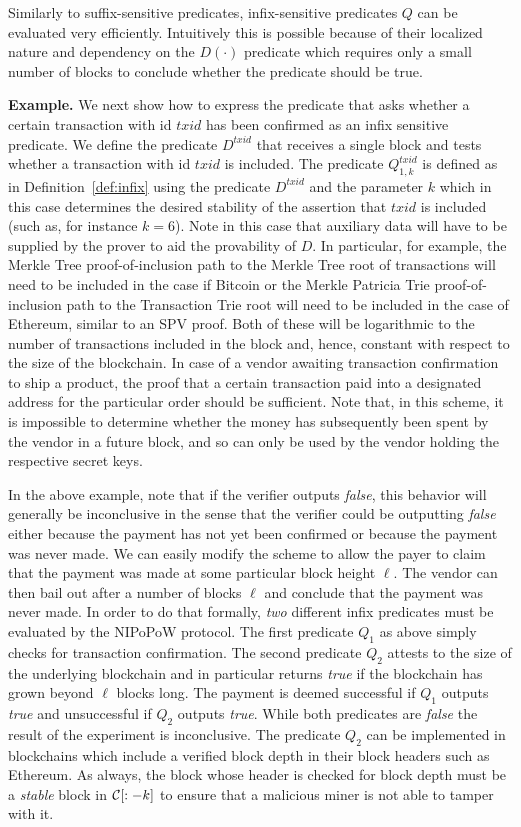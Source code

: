 Similarly to suffix-sensitive predicates, infix-sensitive predicates $Q$ can be
evaluated very efficiently. Intuitively this is possible because of their
localized nature and dependency on the $D(\cdot)$ predicate which requires only
a small number of blocks to conclude whether the predicate should be true.

\noindent\textbf{Example.}
We next show how to express the predicate that asks whether a certain
transaction with id $txid$ has been confirmed as an infix sensitive predicate.
We define the predicate $D^{txid}$ that receives a single block and tests
whether a transaction with id $txid$ is included. The predicate $Q^{txid}_{1,
k}$ is defined as in Definition~\ref{def:infix} using the predicate $D^{txid}$
and the parameter $k$ which in this case determines the desired stability of the
assertion that $txid$ is included (such as, for instance $k = 6$). Note in this
case that auxiliary data will have to be supplied by the prover to aid the
provability of $D$. In particular, for example, the Merkle Tree
proof-of-inclusion path to the Merkle Tree root of transactions will need to be
included in the case if Bitcoin or the Merkle Patricia Trie proof-of-inclusion
path to the Transaction Trie root will need to be included in the case of
Ethereum, similar to an SPV proof. Both of these will be logarithmic to the
number of transactions included in the block and, hence, constant with respect
to the size of the blockchain. In case of a vendor awaiting transaction
confirmation to ship a product, the proof that a certain transaction paid into
a designated address for the particular order should be sufficient. Note that,
in this scheme, it is impossible to determine whether the money has subsequently
been spent by the vendor in a future block, and so can only be used by the
vendor holding the respective secret keys.

In the above example, note that if the verifier outputs \emph{false}, this
behavior will generally be inconclusive in the sense that the verifier could be
outputting \emph{false} either because the payment has not yet been confirmed or
because the payment was never made. We can easily modify the scheme to allow the
payer to claim that the payment was made at some particular block height $\ell$.
The vendor can then bail out after a number of blocks $\ell$ and conclude that
the payment was never made. In order to do that formally, \emph{two} different
infix predicates must be evaluated by the NIPoPoW protocol. The first predicate
$Q_1$ as above simply checks for transaction confirmation. The second predicate
$Q_2$ attests to the size of the underlying blockchain and in particular returns
\emph{true} if the blockchain has grown beyond $\ell$ blocks long. The payment
is deemed successful if $Q_1$ outputs \emph{true} and unsuccessful if $Q_2$
outputs \emph{true}. While both predicates are \emph{false} the result of the
experiment is inconclusive. The predicate $Q_2$ can be implemented in
blockchains which include a verified block depth in their block headers such as
Ethereum. As always, the block whose header is checked for block depth must be
a \emph{stable} block in $\mathcal{C}[:-k]$ to ensure that a malicious miner is not
able to tamper with it.

